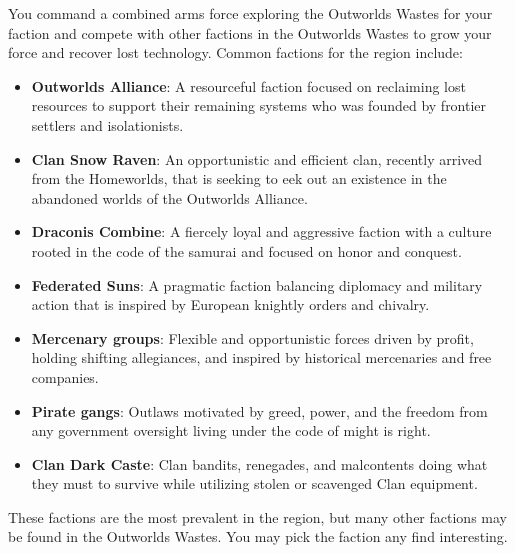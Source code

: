 You command a combined arms force exploring the Outworlds Wastes for your faction and compete with other factions in the Outworlds Wastes to grow your force and recover lost technology.
Common factions for the region include:

\begin{itemize}

  \item {\bfseries Outworlds Alliance}: A resourceful faction focused on reclaiming lost resources to support their remaining systems who was founded by frontier settlers and isolationists.

  \item {\bfseries Clan Snow Raven}: An opportunistic and efficient clan, recently arrived from the Homeworlds, that is seeking to eek out an existence in the abandoned worlds of the Outworlds Alliance. 

  \item {\bfseries Draconis Combine}: A fiercely loyal and aggressive faction with a culture rooted in the code of the samurai and focused on honor and conquest.

  \item {\bfseries Federated Suns}: A pragmatic faction balancing diplomacy and military action that is inspired by European knightly orders and chivalry.

  \item {\bfseries Mercenary groups}: Flexible and opportunistic forces driven by profit, holding shifting allegiances, and inspired by historical mercenaries and free companies.

  \item {\bfseries Pirate gangs}: Outlaws motivated by greed, power, and the freedom from any government oversight living under the code of might is right. 

  \item {\bfseries Clan Dark Caste}: Clan bandits, renegades, and malcontents doing what they must to survive while utilizing stolen or scavenged Clan equipment.

\end{itemize}

These factions are the most prevalent in the region, but many other factions may be found in the Outworlds Wastes.
You may pick the faction any find interesting.
